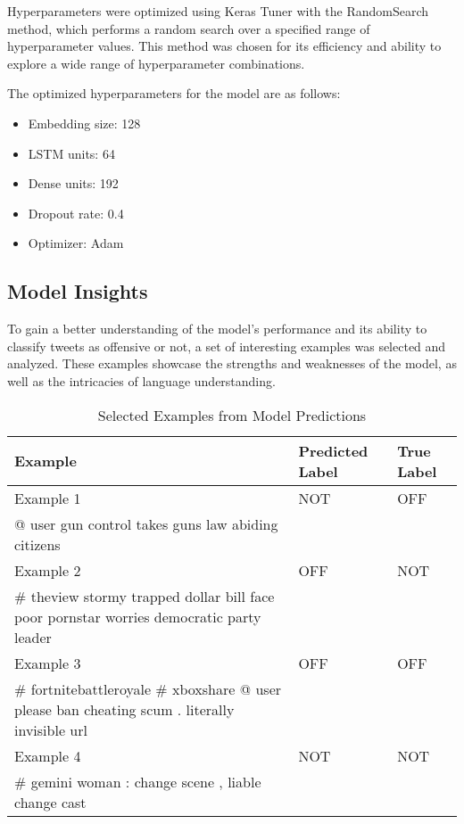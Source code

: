 \documentclass[11pt]{article}
\begin{document}
Hyperparameters were optimized using Keras Tuner with the RandomSearch method, which performs a random search over a specified range of hyperparameter values. This method was chosen for its efficiency and ability to explore a wide range of hyperparameter combinations.

The optimized hyperparameters for the model are as follows:
\begin{itemize}
\item Embedding size: 128
\item LSTM units: 64
\item Dense units: 192
\item Dropout rate: 0.4
\item Optimizer: Adam
\end{itemize}










\subsection{Model Insights}

To gain a better understanding of the model's performance and its ability to classify tweets as offensive or not, a set of interesting examples was selected and analyzed. These examples showcase the strengths and weaknesses of the model, as well as the intricacies of language understanding.


\begin{table}[ht]
\centering
\renewcommand{\arraystretch}{1.3}
\begin{tabularx}{\textwidth}{>{\raggedright\arraybackslash}p{2cm} X X}
\hline
\textbf{Example} & \textbf{Predicted Label} & \textbf{True Label} \\ \hline
Example 1 & NOT & OFF \\
\quad @ user gun control takes guns law abiding citizens & & \tabularnewline \hline
Example 2 & OFF & NOT \\
\quad \# theview stormy trapped dollar bill face poor pornstar worries democratic party leader & & \tabularnewline \hline
Example 3 & OFF & OFF \\
\quad \# fortnitebattleroyale \# xboxshare @ user please ban cheating scum . literally invisible url & & \tabularnewline \hline
Example 4 & NOT & NOT \\
\quad \# gemini woman : change scene , liable change cast & & \tabularnewline \hline
\end{tabularx}
\caption{Selected Examples from Model Predictions}
\label{tab:examplesM12}
\end{table}
\end{document}
